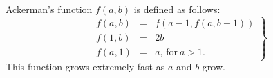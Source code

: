 Ackerman's function $f(a,b)$ is defined as follows:
$$
\left.
\begin{array}{rcl}
f(a,b)&=&f(a-1, f(a,b-1))\\
f(1,b)&=&2b\\
f(a,1)&=&a \text{, for}\ a > 1.
\end{array}
\right\}
$$
This function grows extremely fast as $a$ and $b$ grow.